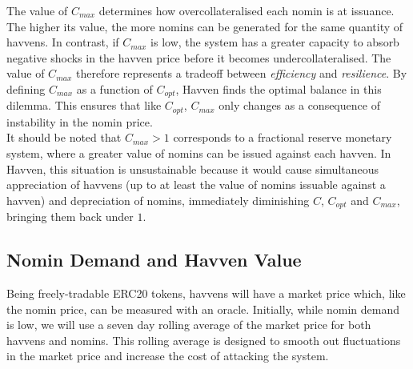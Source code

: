 \begin{center}
\end{center}

\noindent The value of $C_{max}$ determines how overcollateralised each nomin is at issuance. The higher its value, the more nomins can be generated for the same quantity of havvens. In contrast, if $C_{max}$ is low, the system has a greater capacity to absorb negative shocks in the havven price before it becomes undercollateralised.  The value of $C_{max}$ therefore represents a tradeoff between \textit{efficiency} and \textit{resilience}. By defining $C_{max}$ as a function of $C_{opt}$, Havven finds the optimal balance in this dilemma. This ensures that like $C_{opt}$, $C_{max}$ only changes as a consequence of instability in the nomin price. \\

\noindent It should be noted that $C_{max} > 1$ corresponds to a fractional reserve monetary
system, where a greater value of nomins can be issued against each havven. In Havven, this
situation is unsustainable because it would cause simultaneous appreciation of havvens (up to at
least the value of nomins issuable against a havven) and depreciation of nomins, immediately
diminishing $C$, $C_{opt}$ and $C_{max}$, bringing them back under $1$.

\newpage

\subsection{Nomin Demand and Havven Value}

\noindent Being freely-tradable ERC20 tokens, havvens will have a market price which, like
the nomin price, can be measured with an oracle.
Initially, while nomin demand is low, we will use a seven day rolling average of the market price for both havvens and nomins.
This rolling average is designed to smooth out fluctuations in the market price and increase the cost of attacking the system.\\

